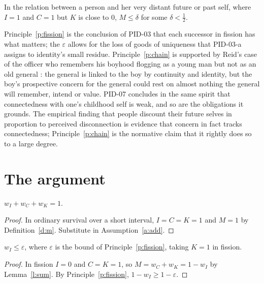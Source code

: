 \documentclass{situationist-preprint}
\begin{document}
\begin{principle}\label{p:chain}
In the relation between a person and her very distant future or past self, where $I=1$ and $C=1$ but $K$ is close to $0$, $M \leq \delta$ for some $\delta < \tfrac{1}{2}$.
\end{principle}

Principle~\ref{p:fission} is the conclusion of PID-03 that each successor in fission has what matters; the $\varepsilon$ allows for the loss of goods of uniqueness that PID-03-a assigns to identity's small residue. Principle~\ref{p:chain} is supported by Reid's case of the officer who remembers his boyhood flogging as a young man but not as an old general \citep[III.6]{Reid1785}: the general is linked to the boy by continuity and identity, but the boy's prospective concern for the general could rest on almost nothing the general will remember, intend or value. PID-07 concludes in the same spirit that connectedness with one's childhood self is weak, and so are the obligations it grounds. The empirical finding that people discount their future selves in proportion to perceived disconnection \citep{BartelsUrminsky2011} is evidence that concern in fact tracks connectedness; Principle~\ref{p:chain} is the normative claim that it rightly does so to a large degree.

\section{The argument}\label{s:arg}

\begin{lemma}\label{l:sum}
$w_I + w_C + w_K = 1$.
\end{lemma}

\begin{proof}
In ordinary survival over a short interval, $I=C=K=1$ and $M=1$ by Definition~\ref{d:m}. Substitute in Assumption~\ref{a:add}.
\end{proof}

\begin{lemma}\label{l:wi}
$w_I \leq \varepsilon$, where $\varepsilon$ is the bound of Principle~\ref{p:fission}, taking $K=1$ in fission.
\end{lemma}

\begin{proof}
In fission $I=0$ and $C=K=1$, so $M = w_C + w_K = 1 - w_I$ by Lemma~\ref{l:sum}. By Principle~\ref{p:fission}, $1-w_I \geq 1-\varepsilon$.
\end{proof}
\end{document}
